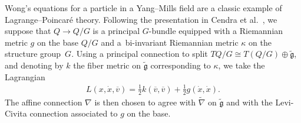 \documentclass[pdftex]{sigma}
\numberwithin{equation}{section}
\begin{document}
\begin{Example} Wong's equations \cite{Wong1970} for a particle in a Yang--Mills f\/ield are a classic example of Lagrange--Poincar\'e theory. Following the presentation in Cendra et al.~\cite[Chapter~4]{CeMaRa2001}, we suppose that $ Q \rightarrow Q / G $ is a principal $G$-bundle equipped with a Riemannian metric $g$ on the base $ Q / G $ and a~bi-invariant Riemannian metric $\kappa$ on the structure group~$G$. Using a principal connection to split
 $ T Q / G \cong T ( Q / G ) \oplus \widetilde{ \mathfrak{g} } $, and denoting by $k$ the f\/iber metric on $ \widetilde{ \mathfrak{g} } $ corresponding to $\kappa$, we take the Lagrangian
 \begin{gather*}
 L ( x, \dot{x}, \overline{ v } ) = \frac{1}{2} k ( \overline{ v} , \overline{ v } ) + \frac{1}{2} g ( \dot{x} , \dot{x} ) .
 \end{gather*}
The af\/f\/ine connection $ \nabla $ is then chosen to agree with $ \widetilde{ \nabla } $ on $ \widetilde{ \mathfrak{g} } $ and with the Levi-Civita connection associated to $g$ on the base.


\end{Example}
\end{document}
